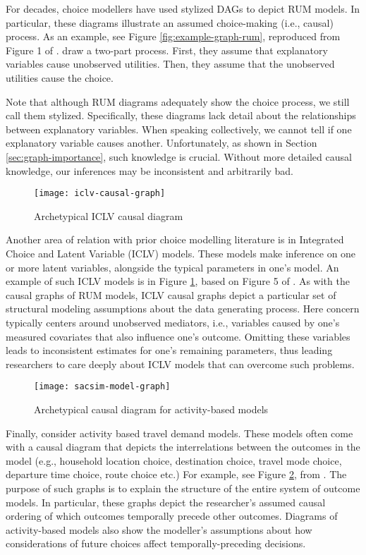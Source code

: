 For decades, choice modellers have used stylized DAGs to depict RUM models.
In particular, these diagrams illustrate an assumed choice-making (i.e., causal) process.
As an example, see Figure \ref{fig:example-graph-rum}, reproduced from Figure 1 of \citet{ben_2002_integration}.
\citeauthor{ben_2002_integration} draw a two-part process.
First, they assume that explanatory variables cause unobserved utilities.
Then, they assume that the unobserved utilities cause the choice.

Note that although RUM diagrams adequately show the choice process, we still call them stylized.
Specifically, these diagrams lack detail about the relationships between explanatory variables.
When speaking collectively, we cannot tell if one explanatory variable causes another.
Unfortunately, as shown in Section \ref{sec:graph-importance}, such knowledge is crucial.
Without more detailed causal knowledge, our inferences may be inconsistent and arbitrarily bad.

\begin{figure}
   \centering
   \texttt{[image: iclv-causal-graph]}
   \caption{Archetypical ICLV causal diagram}
   \label{fig:example-graph-iclv}
\end{figure}

Another area of relation with prior choice modelling literature is in Integrated Choice and Latent Variable (ICLV) models.
These models make inference on one or more latent variables, alongside the typical parameters in one's model.
An example of such ICLV models is in Figure \ref{fig:example-graph-iclv}, based on Figure 5 of \citet{ben_2002_integration}.
As with the causal graphs of RUM models, ICLV causal graphs depict a particular set of structural modeling assumptions about the data generating process.
Here concern typically centers around unobserved mediators, i.e., variables caused by one's measured covariates that also influence one's outcome.
Omitting these variables leads to inconsistent estimates for one's remaining parameters, thus leading researchers to care deeply about ICLV models that can overcome such problems.

\begin{figure}
   \centering
   \texttt{[image: sacsim-model-graph]}
   \caption{Archetypical causal diagram for activity-based models}
   \label{fig:example-graph-abm}
\end{figure}

Finally, consider activity based travel demand models.
These models often come with a causal diagram that depicts the interrelations between the outcomes in the model (e.g., household location choice, destination choice, travel mode choice, departure time choice, route choice etc.)
For example, see Figure \ref{fig:example-graph-abm}, from \citet[Fig.1]{bradley_2010_sacsim}.
The purpose of such graphs is to explain the structure of the entire system of outcome models.
In particular, these graphs depict the researcher's assumed causal ordering of which outcomes temporally precede other outcomes.
Diagrams of activity-based models also show the modeller's assumptions about how considerations of future choices affect temporally-preceding decisions.

